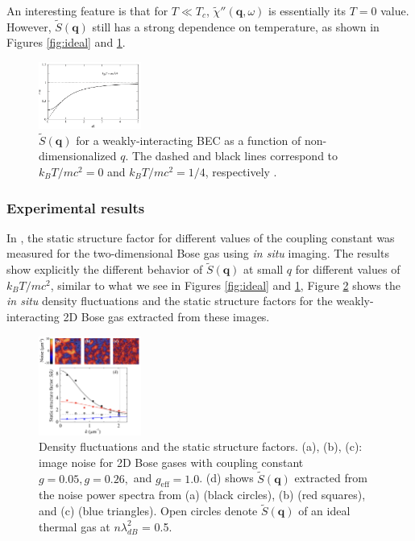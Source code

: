 \documentclass[reprint,
nofootinbib,
amsmath,amssymb,
aps]{revtex4-1}
\begin{document}
An interesting feature is that for $T \ll T_c$, $\widetilde{\chi}''(\mathbf{q},\omega)$ is essentially its $T=0$ value. However, $\widetilde{S}(\mathbf{q})$ still has a strong dependence on temperature, as shown in Figures \ref{fig:ideal} and \ref{fig:interacting}. 

\begin{figure}[!htb]
\label{fig:interacting}
\centering
\includegraphics[width=0.3\textwidth]{figures/interacting.png}
\caption{$\widetilde{S}(\mathbf{q})$ for a weakly-interacting BEC as a function of non-dimensionalized $q$. The dashed and black lines correspond to $k_BT/mc^2=0$ and $k_BT/mc^2 = 1/4$, respectively \cite{pitaevskii2016bose}.}
\end{figure}
\subsubsection{Experimental results}

In \cite{hung2011extracting}, the static structure factor for different values of the coupling constant was measured for the two-dimensional Bose gas using \textit{in situ} imaging. The results show explicitly the different behavior of $\widetilde{S}(\mathbf{q})$ at small $q$ for different values of $k_BT / mc^2$, similar to what we see in Figures \ref{fig:ideal} and \ref{fig:interacting}, Figure \ref{fig:hung2011} shows the \textit{in situ} density fluctuations and the static structure factors for the weakly-interacting 2D Bose gas extracted from these images. 
\begin{figure}[!htb]
\label{fig:hung2011}
\centering
\includegraphics[width=0.3\textwidth]{figures/hung2011.png}
\caption{Density fluctuations and the static structure factors. (a), (b), (c): image noise for 2D Bose gases with coupling constant $g = 0.05, g = 0.26,$ and $g_\text{eff} = 1.0$. (d) shows $\widetilde{S}(\mathbf{q})$ extracted from the noise power spectra from (a) (black circles), (b) (red squares), and (c) (blue triangles). Open circles denote $\widetilde{S}(\mathbf{q})$ of an ideal thermal gas at $n\lambda_{dB}^2$ = 0.5. }
\end{figure}
\end{document}
